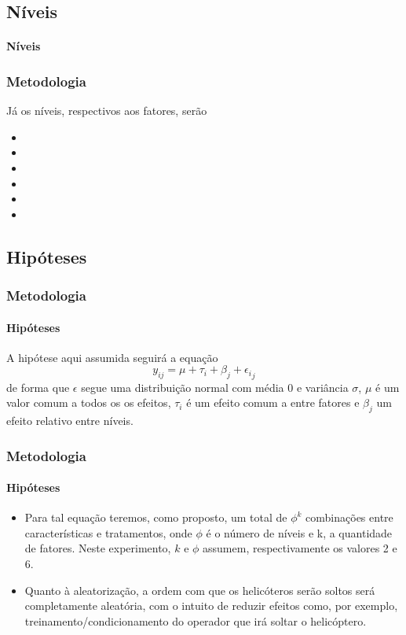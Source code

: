 \documentclass{beamer}
\begin{document}
    \subsection{Níveis}
            \begin{frame}
                \framesubtitle{Níveis}
                    \frametitle{Metodologia}

                        Já os níveis, respectivos aos fatores, serão
                            \begin{itemize}
                                \item
                                \item
                                \item
                                \item
                                \item
                                \item
                            \end{itemize}
        \end{frame}

    \subsection{Hipóteses}
         \begin{frame}
            \frametitle{Metodologia}
               \framesubtitle{Hipóteses}
                  A hipótese aqui assumida seguirá a equação
                     \begin{equation}
                        y_{ij}= \mu + \tau_i + \beta_j + {\epsilon_i}_j
                        \label{eq:equacao definidora}
                     \end{equation}
                  de forma que \large{$\epsilon$} segue uma distribuição normal com média 0 e variância $\sigma$, $\mu$ é um valor comum a todos os os efeitos, $\tau_i$ é um efeito comum a entre fatores e $\beta_j$ um efeito relativo entre níveis.
         \end{frame}

      \begin{frame}
         \frametitle{Metodologia}
            \framesubtitle{Hipóteses}
               \begin{itemize}
                  \item Para tal equação teremos, como proposto, um total de $\phi^k$ combinações entre características e tratamentos, onde $\phi$ é o número de níveis e k, a quantidade de fatores. Neste experimento, $k$ e $\phi$ assumem, respectivamente os valores 2 e 6.

                  \item Quanto à aleatorização, a ordem com que os helicóteros serão soltos será completamente aleatória, com o intuito de reduzir efeitos como, por exemplo, treinamento/condicionamento do operador que irá soltar o helicóptero.

               \end{itemize}
      \end{frame}
\end{document}
